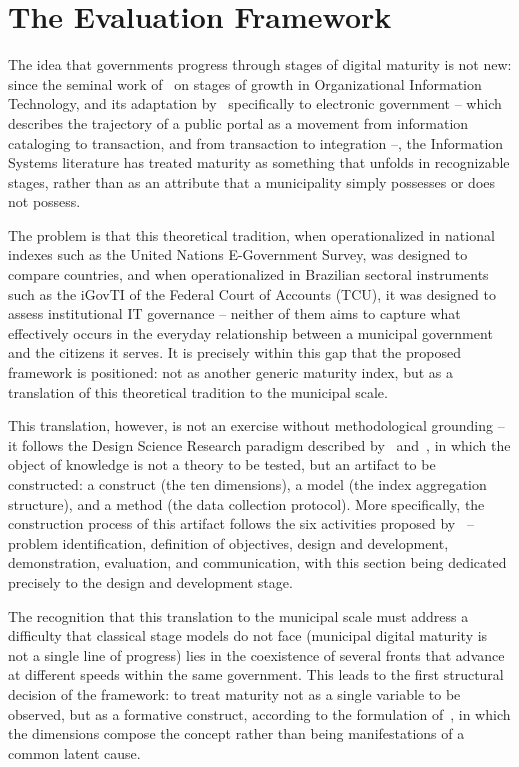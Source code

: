 \documentclass[12pt]{article}
\begin{document}
\section{The Evaluation Framework}

The idea that governments progress through stages of digital maturity is not new: since the seminal work of~\cite{nolan1973} on stages of growth in Organizational Information Technology, and its adaptation by~\cite{layneLee2001} specifically to electronic government -- which describes the trajectory of a public portal as a movement from information cataloging to transaction, and from transaction to integration --, the Information Systems literature has treated maturity as something that unfolds in recognizable stages, rather than as an attribute that a municipality simply possesses or does not possess.

The problem is that this theoretical tradition, when operationalized in national indexes such as the United Nations E-Government Survey, was designed to compare countries, and when operationalized in Brazilian sectoral instruments such as the iGovTI of the Federal Court of Accounts (TCU), it was designed to assess institutional IT governance -- neither of them aims to capture what effectively occurs in the everyday relationship between a municipal government and the citizens it serves. It is precisely within this gap that the proposed framework is positioned: not as another generic maturity index, but as a translation of this theoretical tradition to the municipal scale.

This translation, however, is not an exercise without methodological grounding -- it follows the Design Science Research paradigm described by~\cite{marchSmith1995} and~\cite{hevner2004}, in which the object of knowledge is not a theory to be tested, but an artifact to be constructed: a construct (the ten dimensions), a model (the index aggregation structure), and a method (the data collection protocol). More specifically, the construction process of this artifact follows the six activities proposed by~\cite{peffers2007} -- problem identification, definition of objectives, design and development, demonstration, evaluation, and communication, with this section being dedicated precisely to the design and development stage.

The recognition that this translation to the municipal scale must address a difficulty that classical stage models do not face (municipal digital maturity is not a single line of progress) lies in the coexistence of several fronts that advance at different speeds within the same government. This leads to the first structural decision of the framework: to treat maturity not as a single variable to be observed, but as a formative construct, according to the formulation of~\cite{diamantopoulosWinklhofer2001}, in which the dimensions compose the concept rather than being manifestations of a common latent cause.
\end{document}

